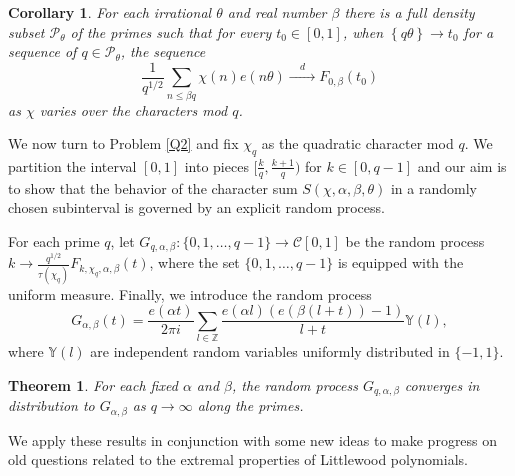 \documentclass[12pt, a4paper]{amsart}
\newtheorem{theorem}{Theorem}
\newtheorem{corollary}{Corollary}
\theoremstyle{remark}
\newcommand{\Z}{\ensuremath{\mathbb{Z}}}
\newcommand{\frc}[1]{\left\{#1\right\}}
\newcommand{\bY}{\mathbb{Y}}
\newcommand{\cP}{\mathcal{P}}
\begin{document}
\begin{corollary}
For each irrational $\theta$ and real number $\beta$ there is a full density
subset $\cP_\theta$ of the primes such that for every $t_0 \in [0,1]$, when
$\frc{q \theta} \rightarrow t_0$ for a sequence of $q \in \cP_\theta$, the
sequence
\[
    \frac{1}{q^{1/2}}\sum_{n \leq \beta q} \chi(n) e(n \theta)
\xrightarrow{\phantom{dd}d\phantom{dd}} F_{0,\beta}(t_0)
\]
as $\chi$ varies over the characters mod $q$.
\end{corollary}

We now turn to Problem \ref{Q2} and fix $\chi_q$ as the quadratic character mod $q$.
We partition the interval $[0,1]$ into pieces $[\frac{k}{q},\frac{k+1}{q})$ for $k\in [0,q-1]$ and our aim is to show that the behavior of the character sum $S(\chi,\alpha,\beta,\theta)$ in a randomly chosen subinterval is governed by an explicit random process.

For each prime $q$, let
$G_{q,\alpha,\beta}:\{0,1, \ldots, q-1\} \rightarrow \mathscr C[0,1]$ be the random process
$k \rightarrow \frac{q^{1/2}}{\tau(\chi_q)}F_{k, \chi_q, \alpha, \beta}(t)$,
where the set $\{0,1, \ldots, q-1\}$ is equipped with the uniform measure.
Finally, we introduce the random process
\[
    G_{\alpha,\beta}(t) = \frac{e(\alpha t)}{2 \pi i}
    \sum_{l \in \Z}
    \frac{e(\alpha l) (e(\beta(l + t)) - 1)}
    {l + t}
    \bY(l),
\]
where $\bY(l)$ are independent random variables uniformly distributed in $\{-1, 1\}$.


\begin{theorem}\label{thm:random-quadratic-process}
    For each fixed $\alpha$ and $\beta$, the random process
    $G_{q,\alpha,\beta}$ converges in distribution to
    $G_{\alpha,\beta}$ as $q\to\infty$ along the primes.
\end{theorem}
 We apply these results in conjunction with some new ideas to make progress on
 old questions related to the extremal properties of Littlewood polynomials.
\end{document}
